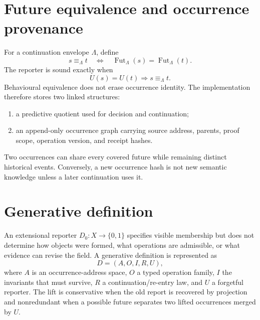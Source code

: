 \documentclass[11pt,a4paper]{article}
\begin{document}
\section{Future equivalence and occurrence provenance}
For a continuation envelope $\Lambda$, define
\begin{equation}
s\equiv_\Lambda t\quad\Longleftrightarrow\quad
\operatorname{Fut}_\Lambda(s)=\operatorname{Fut}_\Lambda(t).
\end{equation}
The reporter is sound exactly when
\begin{equation}
U(s)=U(t)\Longrightarrow s\equiv_\Lambda t.
\end{equation}
Behavioural equivalence does not erase occurrence identity. The implementation therefore stores two linked structures:
\begin{enumerate}
\item a predictive quotient used for decision and continuation;
\item an append-only occurrence graph carrying source address, parents, proof scope, operation version, and receipt hashes.
\end{enumerate}
Two occurrences can share every covered future while remaining distinct historical events. Conversely, a new occurrence hash is not new semantic knowledge unless a later continuation uses it.

\section{Generative definition}
An extensional reporter $D_0:X\to\{0,1\}$ specifies visible membership but does not determine how objects were formed, what operations are admissible, or what evidence can revise the field. A generative definition is represented as
\begin{equation}
D=(A,O,I,R,U),
\end{equation}
where $A$ is an occurrence-address space, $O$ a typed operation family, $I$ the invariants that must survive, $R$ a continuation/re-entry law, and $U$ a forgetful reporter. The lift is conservative when the old report is recovered by projection and nonredundant when a possible future separates two lifted occurrences merged by $U$.
\end{document}
